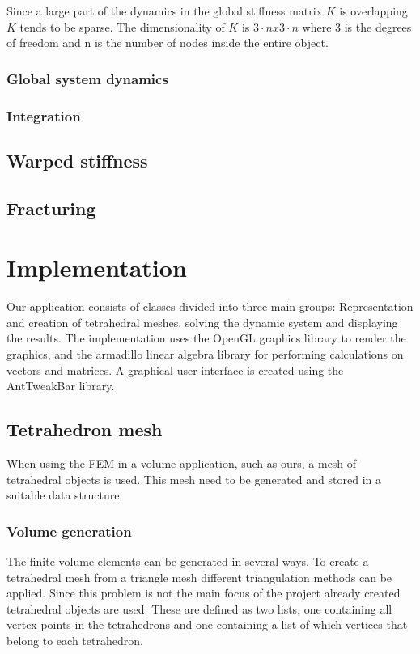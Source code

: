 \documentclass[10pt,a4paper]{article}
\begin{document}
 Since a large part of the dynamics in the global stiffness matrix $K$ is overlapping $K$ tends to be sparse. The dimensionality of $K$ is $3 \cdot n x 3 \cdot n$ where 3 is the degrees of freedom and n is the number of nodes inside the entire object.

\subsubsection{Global system dynamics}


\subsubsection{Integration}


\subsection{Warped stiffness}



\subsection{Fracturing}



\section{Implementation}
Our application consists of classes divided into three main groups: Representation and creation of tetrahedral meshes, solving the dynamic system and displaying the results. The implementation uses the OpenGL graphics library to render the graphics, and the armadillo linear algebra library for performing calculations on vectors and matrices. A graphical user interface is created using the AntTweakBar library.

\subsection{Tetrahedron mesh}
When using the FEM in a volume application, such as ours, a mesh of tetrahedral objects is used. This mesh need to be generated and stored in a suitable data structure.

\subsubsection{Volume generation}
The finite volume elements can be generated in several ways. To create a tetrahedral mesh from a triangle mesh different triangulation methods can be applied. Since this problem is not the main focus of the project already created tetrahedral objects are used. These are defined as two lists, one containing all vertex points in the tetrahedrons and one containing a list of which vertices that belong to each tetrahedron.
\end{document}
